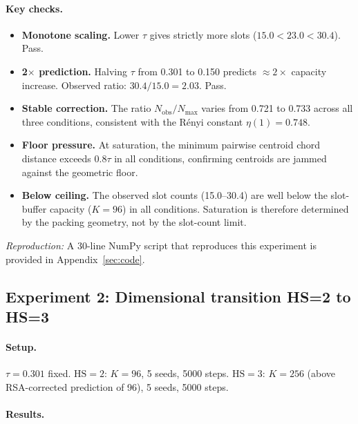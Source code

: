 \documentclass[11pt]{article}
\begin{document}
\paragraph{Key checks.}
\begin{itemize}
  \item \textbf{Monotone scaling.} Lower $\tau$ gives strictly more slots
    ($15.0 < 23.0 < 30.4$). Pass.
  \item \textbf{2$\times$ prediction.} Halving $\tau$ from 0.301 to 0.150
    predicts $\approx 2\times$ capacity increase.
    Observed ratio: $30.4/15.0 = 2.03$. Pass.
  \item \textbf{Stable correction.} The ratio $N_{\mathrm{obs}}/N_{\max}$
    varies from 0.721 to 0.733 across all three conditions, consistent
    with the Rényi constant $\eta(1) = 0.748$.
  \item \textbf{Floor pressure.} At saturation, the minimum pairwise
    centroid chord distance exceeds $0.8\tau$ in all conditions,
    confirming centroids are jammed against the geometric floor.
  \item \textbf{Below ceiling.} The observed slot counts (15.0--30.4) are
    well below the slot-buffer capacity ($K=96$) in all conditions.
    Saturation is therefore determined by the packing geometry, not by
    the slot-count limit.
\end{itemize}

\noindent\textit{Reproduction:} A 30-line NumPy script that reproduces this experiment
is provided in Appendix~\ref{sec:code}.

\subsection{Experiment 2: Dimensional transition HS=2 to HS=3}

\paragraph{Setup.}
$\tau = 0.301$ fixed.
$\mathrm{HS}=2$: $K=96$, 5 seeds, 5000 steps.
$\mathrm{HS}=3$: $K=256$ (above RSA-corrected prediction of 96), 5 seeds, 5000 steps.

\paragraph{Results.}
\end{document}
